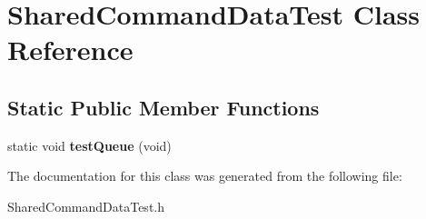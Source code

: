\hypertarget{class_shared_command_data_test}{\section{Shared\+Command\+Data\+Test Class Reference}
\label{class_shared_command_data_test}
}
\subsection*{Static Public Member Functions}
\begin{DoxyCompactItemize}
\item 
\hypertarget{class_shared_command_data_test_a76fffdb3ad84ae700627cdbe1c575db8}{static void {\bfseries test\+Queue} (void)}\label{class_shared_command_data_test_a76fffdb3ad84ae700627cdbe1c575db8}

\end{DoxyCompactItemize}


The documentation for this class was generated from the following file\+:\begin{DoxyCompactItemize}
\item 
Shared\+Command\+Data\+Test.\+h\end{DoxyCompactItemize}
